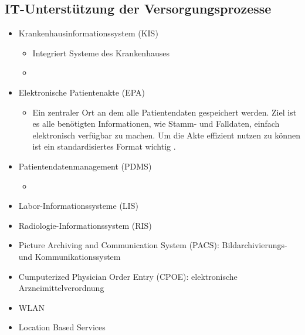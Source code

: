 \subsection{IT-Unterstützung der Versorgungsprozesse}
\parencite{oswald2019} \parencite[14]{braeutigam2017}
\begin{itemize}
	\item Krankenhausinformationssystem (KIS)

	\begin{itemize}
		\item Integriert Systeme des Krankenhauses
		\item 
	\end{itemize}
	\item Elektronische Patientenakte (EPA)
	\begin{itemize}
		\item Ein zentraler Ort an dem alle Patientendaten gespeichert werden. Ziel ist es alle benötigten Informationen, wie Stamm- und Falldaten, einfach elektronisch verfügbar zu machen. Um die Akte effizient nutzen zu können ist ein standardisiertes Format wichtig \parencite[62]{oswald2019}.
	\end{itemize}
	\item Patientendatenmanagement (PDMS)
	\begin{itemize}
		\item 
	\end{itemize}
	\item Labor-Informationssysteme (LIS)
	\item Radiologie-Informationssystem (RIS)
	\item Picture Archiving and Communication System (PACS): Bildarchivierungs- und Kommunikationssystem
	\item Cumputerized Physician Order Entry (CPOE): elektronische Arzneimittelverordnung
	\item WLAN
	\item Location Based Services \parencite{mci/Leimeister2006}
\end{itemize}
